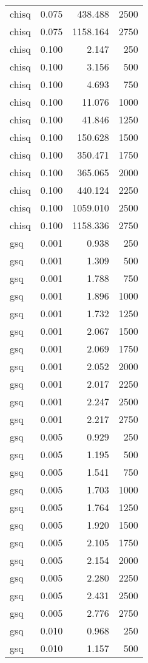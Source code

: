 \begin{table}
\begin{tabular}{lrrr}
chisq & 0.075 & 438.488 & 2500 \\
chisq & 0.075 & 1158.164 & 2750 \\
chisq & 0.100 & 2.147 & 250 \\
chisq & 0.100 & 3.156 & 500 \\
chisq & 0.100 & 4.693 & 750 \\
chisq & 0.100 & 11.076 & 1000 \\
chisq & 0.100 & 41.846 & 1250 \\
chisq & 0.100 & 150.628 & 1500 \\
chisq & 0.100 & 350.471 & 1750 \\
chisq & 0.100 & 365.065 & 2000 \\
chisq & 0.100 & 440.124 & 2250 \\
chisq & 0.100 & 1059.010 & 2500 \\
chisq & 0.100 & 1158.336 & 2750 \\
gsq & 0.001 & 0.938 & 250 \\
gsq & 0.001 & 1.309 & 500 \\
gsq & 0.001 & 1.788 & 750 \\
gsq & 0.001 & 1.896 & 1000 \\
gsq & 0.001 & 1.732 & 1250 \\
gsq & 0.001 & 2.067 & 1500 \\
gsq & 0.001 & 2.069 & 1750 \\
gsq & 0.001 & 2.052 & 2000 \\
gsq & 0.001 & 2.017 & 2250 \\
gsq & 0.001 & 2.247 & 2500 \\
gsq & 0.001 & 2.217 & 2750 \\
gsq & 0.005 & 0.929 & 250 \\
gsq & 0.005 & 1.195 & 500 \\
gsq & 0.005 & 1.541 & 750 \\
gsq & 0.005 & 1.703 & 1000 \\
gsq & 0.005 & 1.764 & 1250 \\
gsq & 0.005 & 1.920 & 1500 \\
gsq & 0.005 & 2.105 & 1750 \\
gsq & 0.005 & 2.154 & 2000 \\
gsq & 0.005 & 2.280 & 2250 \\
gsq & 0.005 & 2.431 & 2500 \\
gsq & 0.005 & 2.776 & 2750 \\
gsq & 0.010 & 0.968 & 250 \\
gsq & 0.010 & 1.157 & 500 \\

\end{tabular}
\end{table}

